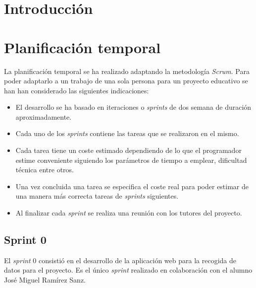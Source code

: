 
\section{Introducción}

\section{Planificación temporal}

La planificación temporal se ha realizado adaptando la metodología \textit{Scrum}. Para poder adaptarlo a un trabajo de una sola persona para un proyecto educativo se han han considerado las siguientes indicaciones:

\begin{itemize}
	\item El desarrollo se ha basado en iteraciones o \textit{sprints} de dos semana de duración aproximadamente.
	\item Cada uno de los \textit{sprints} contiene las tareas que se realizaron en el mismo. 
	\item Cada tarea tiene un coste estimado dependiendo de lo que el programador estime conveniente siguiendo los parámetros de tiempo a emplear, dificultad técnica entre otros.
	\item Una vez concluida una tarea se especifica el coste real para poder estimar de una manera más correcta tareas de \textit{sprints} siguientes.
	\item Al finalizar cada \textit{sprint} se realiza una reunión con los tutores del proyecto.
\end{itemize}

\subsection{Sprint 0}

El \textit{sprint} 0 consistió en el desarrollo de la aplicación web para la recogida de datos para el proyecto. Es el único \textit{sprint} realizado en colaboración con el alumno José Miguel Ramírez Sanz. 


